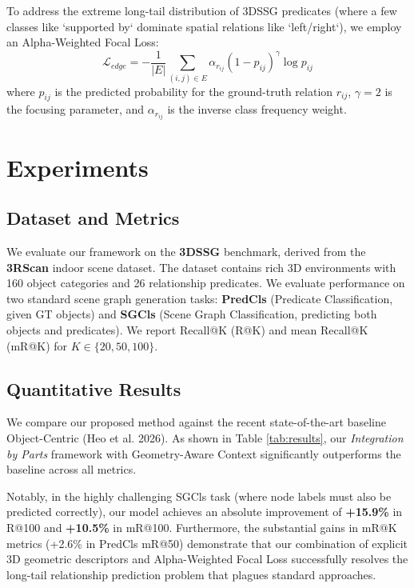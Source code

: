 \documentclass[letterpaper]{article}
\begin{document}
To address the extreme long-tail distribution of 3DSSG predicates (where a few classes like `supported by` dominate spatial relations like `left/right`), we employ an Alpha-Weighted Focal Loss:
\begin{equation}
\mathcal{L}_{edge} = - \frac{1}{|E|} \sum_{(i,j) \in E} \alpha_{r_{ij}} (1 - p_{ij})^{\gamma} \log p_{ij}
\end{equation}
where $p_{ij}$ is the predicted probability for the ground-truth relation $r_{ij}$, $\gamma=2$ is the focusing parameter, and $\alpha_{r_{ij}}$ is the inverse class frequency weight.

\section{Experiments}

\subsection{Dataset and Metrics}
We evaluate our framework on the \textbf{3DSSG} benchmark, derived from the \textbf{3RScan} indoor scene dataset. The dataset contains rich 3D environments with 160 object categories and 26 relationship predicates. We evaluate performance on two standard scene graph generation tasks: \textbf{PredCls} (Predicate Classification, given GT objects) and \textbf{SGCls} (Scene Graph Classification, predicting both objects and predicates). We report Recall@K (R@K) and mean Recall@K (mR@K) for $K \in \{20, 50, 100\}$.

\subsection{Quantitative Results}
We compare our proposed method against the recent state-of-the-art baseline Object-Centric (Heo et al. 2026). As shown in Table \ref{tab:results}, our \textit{Integration by Parts} framework with Geometry-Aware Context significantly outperforms the baseline across all metrics. 

Notably, in the highly challenging SGCls task (where node labels must also be predicted correctly), our model achieves an absolute improvement of \textbf{+15.9\%} in R@100 and \textbf{+10.5\%} in mR@100. Furthermore, the substantial gains in mR@K metrics (+2.6\% in PredCls mR@50) demonstrate that our combination of explicit 3D geometric descriptors and Alpha-Weighted Focal Loss successfully resolves the long-tail relationship prediction problem that plagues standard approaches.
\end{document}
